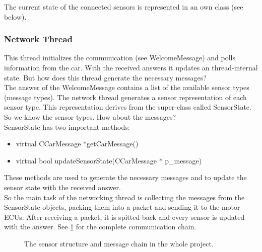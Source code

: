 The current state of the connected sensors is represented in an own class (see below).\\

\subsubsection{Network Thread}

This thread initializes the communication (see WelcomeMessage) and polls information from the car. With the received answers it updates an thread-internal state. But how does this thread generate the necessary messages?\\

The answer of the WelcomeMessage contains a list of the available sensor types (message types). The network thread generates a sensor representation of each sensor type. This representation derives from the super-class called SensorState. So we know the sensor types. How about the messages?\\

SensorState has two important methods: 
\begin{itemize}
	\item[] virtual CCarMessage *getCarMessage()
	\item[] virtual bool updateSensorState(CCarMessage * p\_message)
\end{itemize}

These methods are used to generate the necessary messages and to update the sensor state with the received answer.\\

So the main task of the networking thread is collecting the messages from the SensorState objects, packing them into a packet and sending it to the motor-ECUs. After receiving a packet, it is spitted back and every sensor is updated with the answer. See \ref{sensors} for the complete communication chain.

\begin{figure}[p]
	\caption{The sensor structure and message chain in the whole project.} \label{sensors}
\end{figure}

